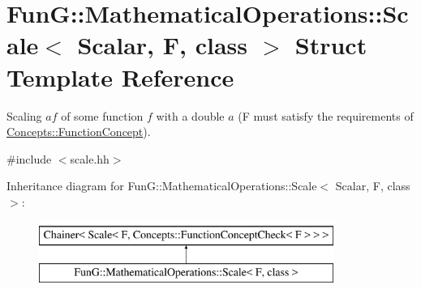 \hypertarget{structFunG_1_1MathematicalOperations_1_1Scale}{\section{Fun\-G\-:\-:Mathematical\-Operations\-:\-:Scale$<$ Scalar, F, class $>$ Struct Template Reference}
\label{structFunG_1_1MathematicalOperations_1_1Scale}
}


Scaling $ af $ of some function $ f $ with a double $ a $ (F must satisfy the requirements of \hyperlink{structFunG_1_1Concepts_1_1FunctionConcept}{Concepts\-::\-Function\-Concept}).  




{\ttfamily \#include $<$scale.\-hh$>$}

Inheritance diagram for Fun\-G\-:\-:Mathematical\-Operations\-:\-:Scale$<$ Scalar, F, class $>$\-:\begin{figure}[H]
\begin{center}
\leavevmode
\includegraphics[height=2.000000cm]{structFunG_1_1MathematicalOperations_1_1Scale}
\end{center}
\end{figure}
